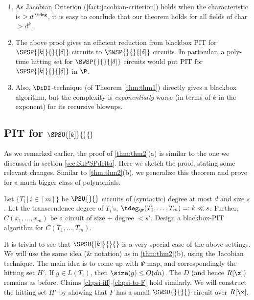 %

\begin{remark*}
\begin{enumerate}
    \setlength\itemsep{1em}
    \item As Jacobian Criterion (\autoref{fact:jacobian-criterion}) holds when the characteristic is $> d^{\,\tdeg}$, it is easy to conclude that our theorem holds for all fields of char $> d^k$.
    \item The above proof gives an efficient reduction from blackbox PIT for $\SPSP{[k]}{}{[\delta]}$ circuits to $\SWSP{}{}{[\delta]}$ circuits. In particular, a poly-time hitting set for $\SWSP{}{}{[\delta]}$ circuits would put PIT for $\SPSP{[k]}{}{[\delta]}$ in $\P$. 
    \item Also, $\DiDI$-technique (of Theorem \autoref{thm:thm1}) directly gives a blackbox algorithm, but the complexity is {\em exponentially} worse (in terms of $k$ in the exponent) for its recursive blowups.
\end{enumerate}
\end{remark*}

\subsection{PIT for \texorpdfstring{$\SPSU{[k]}{}{}$}{SkPSU}}

As we remarked earlier, the proof of \autoref{thm:thm2}(a) is similar to the one we discussed in section \ref{sec:SkPSPdelta}. Here we sketch the proof, stating some relevant changes. Similar to \autoref{thm:thm2}(b), we generalize this theorem and prove for a much bigger class of polynomials.  

\begin{problem}\label{prob:prob2-thm2}
 Let $\{T_i \,|\, i \in [m]\}$ be $\PSU{}{}$ circuits of (syntactic) degree at most $d$ and size $s$. Let the transcendence degree of $T_i$'s, $\tdeg_{\F}(T_1,\hdots,T_m) =:k \ll s$. Further, $C(x_1,\hdots,x_m)$ be a circuit of size + degree $<s'$. Design a blackbox-PIT algorithm for $C(T_1,\hdots,T_m)$.
\end{problem}

It is trivial to see that $\SPSU{[k]}{}{}$ is a very special case of the above settings. We will use the same idea (\& notation) as in \autoref{thm:thm2}(b), using the Jacobian technique. The main idea is to come up with $\Psi$ map, and correspondingly the hitting set $H'$. If $g \in L(T_i)$, then $\size(g) \le O(dn)$. 
%
The $D$ (and hence $R[\x]$) remains as before. Claims \ref{cl:psi-iff}-\ref{cl:psi-to-F} hold similarly. We will construct the hitting set $H'$ by showing that $F$ has a small $\SWSU{}{}{}$ circuit over $R[\x]$. 

